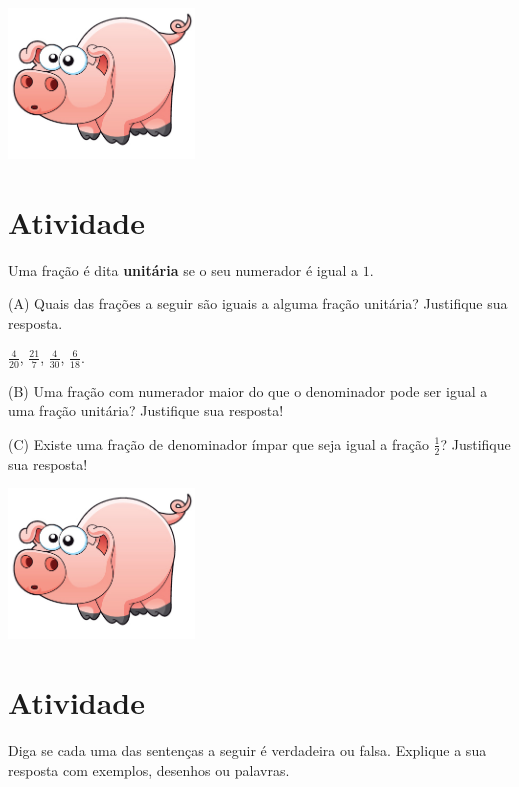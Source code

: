 \documentclass[a4,12pt]{book}
\begin{document}
\includegraphics[width=\textwidth,height=4cm, keepaspectratio]{pig}
\section{Atividade}







Uma fração é dita {\bf unitária} se o seu numerador é igual a $1$. 

(A) Quais das frações a seguir são iguais a alguma fração unitária? Justifique sua resposta.

$\frac{4}{20}$, $\frac{21}{7}$, $\frac{4}{30}$, $\frac{6}{18}$.

(B) Uma fração com numerador maior do que o denominador pode ser igual a uma fração unitária? Justifique sua resposta!

(C) Existe uma fração de denominador ímpar que seja igual a fração $\frac{1}{2}$? Justifique sua resposta! 







\includegraphics[width=\textwidth,height=4cm, keepaspectratio]{pig}
\section{Atividade}







Diga se cada uma das sentenças a seguir é verdadeira ou falsa. Explique a sua resposta com exemplos, desenhos ou palavras.
\end{document}
